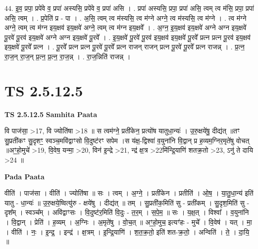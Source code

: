 \documentclass[17pt]{extarticle}
\begin{document}
44. इ॒व॒ प्रपा॒ प्रपे॑वे व॒ प्रपा॑ अस्यसि॒ प्रपे॑वे व॒ प्रपा॑ असि । . प्रपा॑ अस्यसि॒ प्रपा॒ प्रपा॑ असि॒ त्वम् त्व म॑सि॒ प्रपा॒ प्रपा॑ असि॒ त्वम् । . प्र॒पेति॑ प्र - पा । . अ॒सि॒ त्वम् त्व म॑स्यसि॒ त्व म॑ग्ने अग्ने॒ त्व म॑स्यसि॒ त्व म॑ग्ने । . त्व म॑ग्ने अग्ने॒ त्वम् त्व म॑ग्न इय॒क्षव॑ इय॒क्षवे॑ अग्ने॒ त्वम् त्व म॑ग्न इय॒क्षवे᳚ । . अ॒ग्न॒ इ॒य॒क्षव॑ इय॒क्षवे॑ अग्ने अग्न इय॒क्षवे॑ पू॒रवे॑ पू॒रव॑ इय॒क्षवे॑ अग्ने अग्न इय॒क्षवे॑ पू॒रवे᳚ । . इ॒य॒क्षवे॑ पू॒रवे॑ पू॒रव॑ इय॒क्षव॑ इय॒क्षवे॑ पू॒रवे᳚ प्रत्न प्रत्न पू॒रव॑ इय॒क्षव॑ इय॒क्षवे॑ पू॒रवे᳚ प्रत्न । . पू॒रवे᳚ प्रत्न प्रत्न पू॒रवे॑ पू॒रवे᳚ प्रत्न राजन् राजन् प्रत्न पू॒रवे॑ पू॒रवे᳚ प्रत्न राजन्न् । . प्र॒त्न॒ रा॒ज॒न् रा॒ज॒न् प्र॒त्न॒ प्र॒त्न॒ रा॒ज॒न्न् । . रा॒ज॒न्निति॑ राजन्न् । \newline
\pagebreak
{}
\section*{ TS 2.5.12.5 }

\textbf{TS 2.5.12.5 } \newline
\textbf{Samhita Paata} \newline

वि पाज॑सा॒ >17, वि ज्योति॑षा >18 ॥ स त्वम॑ग्ने॒ प्रती॑केन॒ प्रत्यो॑ष यातुधा॒न्यः॑ । उ॒रु॒क्षये॑षु॒ दीद्य॑त् ॥तꣳ सु॒प्रती॑कꣳ सु॒दृशꣳ॒॒ स्वञ्च॒मवि॑द्वाꣳसो वि॒दुष्ट॑रꣳ सपेम ।स य॑क्ष॒-द्विश्वा॑ व॒युना॑नि वि॒द्वान् प्र ह॒व्यम॒ग्निर॒मृते॑षु वोचत् ॥अꣳ॒॒हो॒मुचे॑ >19, वि॒वेष॒ यन्मा॒ >20, विन॑ इ॒न्द्रे >21, न्द्र॑ क्ष॒त्र >22मि॑न्द्रि॒याणि॑ शतक्र॒तो >23, ऽनु॑ ते दायि >24 ॥ \newline

\textbf{Pada Paata} \newline

वीति॑ । पाज॑सा । वीति॑ । ज्योति॑षा ॥ सः । त्वम् । अ॒ग्ने॒ । प्रती॑केन । प्रतीति॑ । ओ॒ष॒ । या॒तु॒धा॒न्य॑ इति॑ यातु - धा॒न्यः॑ ॥ उ॒रु॒क्षये॒ष्वित्यु॑रु - क्षये॑षु । दीद्य॑त् ॥ तम् । सु॒प्रती॑क॒मिति॑ सु - प्रती॑कम् । सु॒दृश॒मिति॑ सु - दृश᳚म् । स्वञ्च᳚म् । अवि॑द्वाꣳसः । वि॒दुष्ट॑र॒मिति॑ वि॒दुः - त॒र॒म् । स॒पे॒म॒ ॥ सः । य॒क्ष॒त् । विश्वा᳚ । व॒युना॑नि । वि॒द्वान् । प्रेति॑ । ह॒व्यम् । अ॒ग्निः । अ॒मृते॑षु । वो॒च॒त् ॥ अꣳ॒॒हो॒मुच॒ इत्यꣳ॑हः - मुचे᳚ । वि॒वेष॑ । यत् । मा॒ । वीति॑ । नः॒ । इ॒न्द्र॒ । इन्द्र॑ । क्ष॒त्रम् । इ॒न्द्रि॒याणि॑ । श॒त॒क्र॒तो॒ इति॑ शत-क्र॒तो॒ । अन्विति॑ । ते॒ । दा॒यि॒ ॥  \newline
\end{document}
